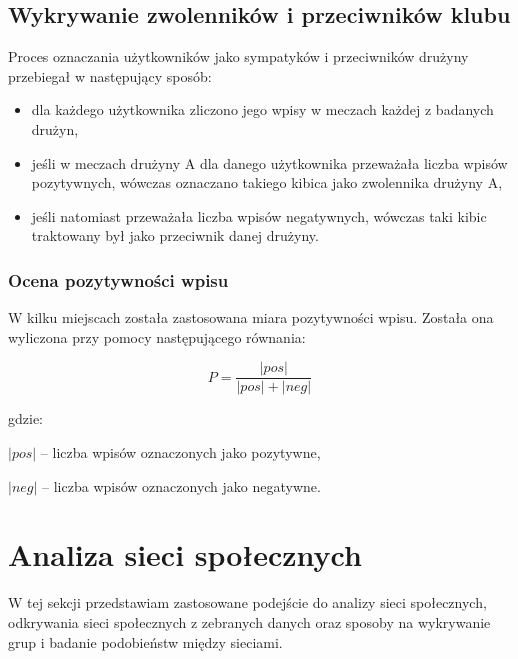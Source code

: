 \subsection{Wykrywanie zwolenników i przeciwników klubu}
\label{subsection:wykrywanie-zwolennikow}
Proces oznaczania użytkowników jako sympatyków i przeciwników drużyny przebiegał
w następujący sposób:
\begin{itemize}
  \item dla każdego użytkownika zliczono jego wpisy w meczach każdej z badanych 
  drużyn,
  \item jeśli w meczach drużyny A dla danego użytkownika przeważała liczba 
  wpisów pozytywnych, wówczas oznaczano takiego kibica jako zwolennika drużyny A,
  \item jeśli natomiast przeważała liczba wpisów negatywnych, wówczas taki kibic
  traktowany był jako przeciwnik danej drużyny.  
\end{itemize} 




\subsubsection{Ocena pozytywności wpisu}
W kilku miejscach została zastosowana miara pozytywności wpisu.
Została ona wyliczona przy pomocy następującego równania:

\begin{equation}
\label{equation:pozytywnosc}
P = \frac{|pos|}{|pos| + |neg|}
\end{equation}

gdzie:

$|pos|$ -- liczba wpisów oznaczonych jako pozytywne,

$|neg|$ -- liczba wpisów oznaczonych jako negatywne.


\section{Analiza sieci społecznych}
\label{section:siecispoleczne}
W tej sekcji przedstawiam zastosowane podejście do analizy sieci społecznych,
odkrywania sieci społecznych z zebranych danych oraz sposoby na wykrywanie grup
i badanie podobieństw między sieciami.
